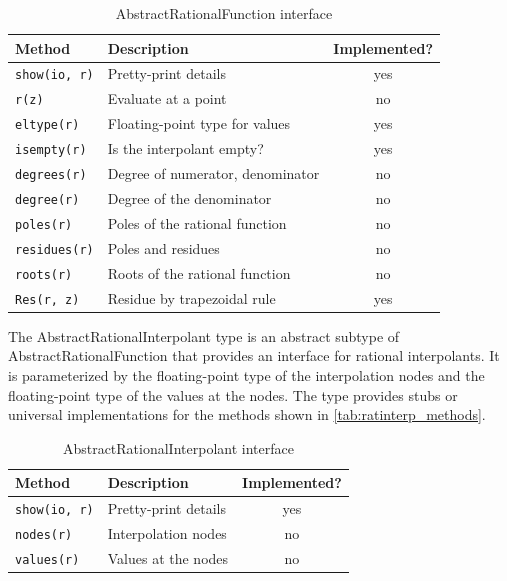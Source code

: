\documentclass{juliacon}
\begin{document}
\begin{table}
    \caption{AbstractRationalFunction interface}
    \begin{tabular}{l|l|c}\hline
        Method & Description & Implemented? \\\hline
        \verb|show(io, r)| & Pretty-print details & yes \\
        \verb|r(z)| & Evaluate at a point & no \\
        \verb|eltype(r)| & Floating-point type for values & yes \\
        \verb|isempty(r)| & Is the interpolant empty? & yes \\
        \verb|degrees(r)| & Degree of numerator, denominator & no \\
        \verb|degree(r)| & Degree of the denominator & no \\ 
        \verb|poles(r)| & Poles of the rational function & no \\
        \verb|residues(r)| & Poles and residues & no \\
        \verb|roots(r)| & Roots of the rational function & no \\
        \verb|Res(r, z)| & Residue by trapezoidal rule & yes
    \end{tabular}
    \label{tab:ratfun_methods}
\end{table}

The \textsf{AbstractRationalInterpolant} type is an abstract subtype of \textsf{AbstractRationalFunction} that provides an interface for rational interpolants. It is parameterized by the floating-point type of the interpolation nodes and the floating-point type of the values at the nodes. The type provides stubs or universal implementations for the methods shown in \autoref{tab:ratinterp_methods}.

\begin{table}
    \caption{AbstractRationalInterpolant interface}
    \begin{tabular}{l|l|c}\hline
        Method & Description & Implemented? \\\hline
        \verb|show(io, r)| & Pretty-print details & yes \\
        \verb|nodes(r)| & Interpolation nodes & no \\
        \verb|values(r)| & Values at the nodes & no \\
    \end{tabular}
    \label{tab:ratinterp_methods}
\end{table}
\end{document}
